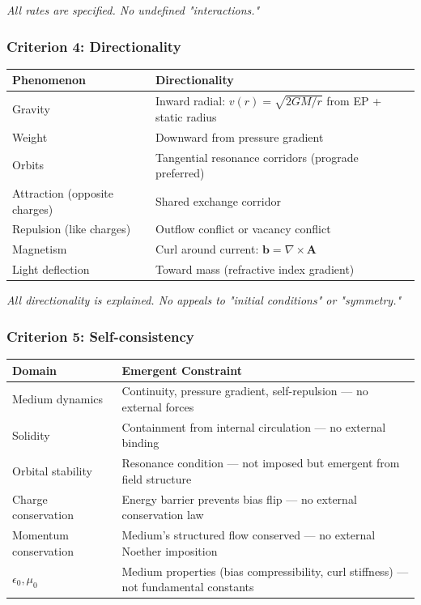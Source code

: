 \documentclass[12pt, a4paper]{article}
\begin{document}
\textit{All rates are specified. No undefined "interactions."}

\subsubsection{Criterion 4: Directionality}

\begin{center}
\begin{tabular}{|p{3.5cm}|p{10cm}|}
\hline
\textbf{Phenomenon} & \textbf{Directionality} \\
\hline
Gravity & Inward radial: \( v(r) = \sqrt{2GM/r} \) from EP + static radius \\
\hline
Weight & Downward from pressure gradient \\
\hline
Orbits & Tangential resonance corridors (prograde preferred) \\
\hline
Attraction (opposite charges) & Shared exchange corridor \\
\hline
Repulsion (like charges) & Outflow conflict or vacancy conflict \\
\hline
Magnetism & Curl around current: \( \mathbf{b} = \nabla \times \mathbf{A} \) \\
\hline
Light deflection & Toward mass (refractive index gradient) \\
\hline
\end{tabular}
\end{center}

\textit{All directionality is explained. No appeals to "initial conditions" or "symmetry."}

\subsubsection{Criterion 5: Self-consistency}

\begin{center}
\begin{tabular}{|p{3.5cm}|p{10cm}|}
\hline
\textbf{Domain} & \textbf{Emergent Constraint} \\
\hline
Medium dynamics & Continuity, pressure gradient, self-repulsion — no external forces \\
\hline
Solidity & Containment from internal circulation — no external binding \\
\hline
Orbital stability & Resonance condition — not imposed but emergent from field structure \\
\hline
Charge conservation & Energy barrier prevents bias flip — no external conservation law \\
\hline
Momentum conservation & Medium's structured flow conserved — no external Noether imposition \\
\hline
\( \epsilon_0, \mu_0 \) & Medium properties (bias compressibility, curl stiffness) — not fundamental constants \\
\hline
\end{tabular}
\end{center}
\end{document}

